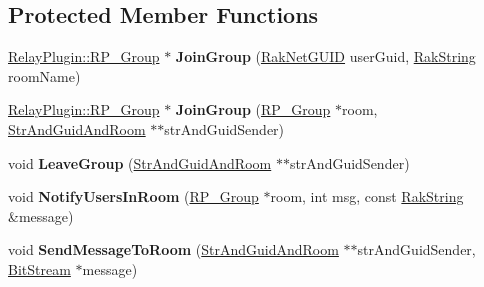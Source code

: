 \subsection*{Protected Member Functions}
\begin{DoxyCompactItemize}
\item 
\hypertarget{class_rak_net_1_1_relay_plugin_a9066c518963334adb97deb1fc286583d}{\hyperlink{struct_rak_net_1_1_relay_plugin_1_1_r_p___group}{Relay\-Plugin\-::\-R\-P\-\_\-\-Group} $\ast$ {\bfseries Join\-Group} (\hyperlink{struct_rak_net_1_1_rak_net_g_u_i_d}{Rak\-Net\-G\-U\-I\-D} user\-Guid, \hyperlink{class_rak_net_1_1_rak_string}{Rak\-String} room\-Name)}\label{class_rak_net_1_1_relay_plugin_a9066c518963334adb97deb1fc286583d}

\item 
\hypertarget{class_rak_net_1_1_relay_plugin_a655808328ff834cb2ffab74c1941efbf}{\hyperlink{struct_rak_net_1_1_relay_plugin_1_1_r_p___group}{Relay\-Plugin\-::\-R\-P\-\_\-\-Group} $\ast$ {\bfseries Join\-Group} (\hyperlink{struct_rak_net_1_1_relay_plugin_1_1_r_p___group}{R\-P\-\_\-\-Group} $\ast$room, \hyperlink{struct_rak_net_1_1_relay_plugin_1_1_str_and_guid_and_room}{Str\-And\-Guid\-And\-Room} $\ast$$\ast$str\-And\-Guid\-Sender)}\label{class_rak_net_1_1_relay_plugin_a655808328ff834cb2ffab74c1941efbf}

\item 
\hypertarget{class_rak_net_1_1_relay_plugin_a6bf99497ef40ce441cabe0a053585a45}{void {\bfseries Leave\-Group} (\hyperlink{struct_rak_net_1_1_relay_plugin_1_1_str_and_guid_and_room}{Str\-And\-Guid\-And\-Room} $\ast$$\ast$str\-And\-Guid\-Sender)}\label{class_rak_net_1_1_relay_plugin_a6bf99497ef40ce441cabe0a053585a45}

\item 
\hypertarget{class_rak_net_1_1_relay_plugin_a20c5115dcd603632e4a52a5551ad1cef}{void {\bfseries Notify\-Users\-In\-Room} (\hyperlink{struct_rak_net_1_1_relay_plugin_1_1_r_p___group}{R\-P\-\_\-\-Group} $\ast$room, int msg, const \hyperlink{class_rak_net_1_1_rak_string}{Rak\-String} \&message)}\label{class_rak_net_1_1_relay_plugin_a20c5115dcd603632e4a52a5551ad1cef}

\item 
\hypertarget{class_rak_net_1_1_relay_plugin_a7186a881b63ac9d92a7e27ee4db66990}{void {\bfseries Send\-Message\-To\-Room} (\hyperlink{struct_rak_net_1_1_relay_plugin_1_1_str_and_guid_and_room}{Str\-And\-Guid\-And\-Room} $\ast$$\ast$str\-And\-Guid\-Sender, \hyperlink{class_rak_net_1_1_bit_stream}{Bit\-Stream} $\ast$message)}\label{class_rak_net_1_1_relay_plugin_a7186a881b63ac9d92a7e27ee4db66990}


\end{DoxyCompactItemize}
